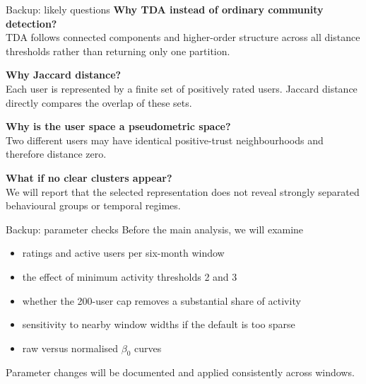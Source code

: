\documentclass[aspectratio=169,11pt]{beamer}
\newcommand{\term}[1]{\textcolor{Ocean}{\textbf{#1}}}
\begin{document}
\appendix

\begin{frame}[noframenumbering]{Backup: likely questions}
  \small
  \term{Why TDA instead of ordinary community detection?}\\
  TDA follows connected components and higher-order structure across all distance thresholds rather than returning only one partition.

  \vspace{0.35cm}
  \term{Why Jaccard distance?}\\
  Each user is represented by a finite set of positively rated users. Jaccard distance directly compares the overlap of these sets.

  \vspace{0.35cm}
  \term{Why is the user space a pseudometric space?}\\
  Two different users may have identical positive-trust neighbourhoods and therefore distance zero.

  \vspace{0.35cm}
  \term{What if no clear clusters appear?}\\
  We will report that the selected representation does not reveal strongly separated behavioural groups or temporal regimes.
\end{frame}

\begin{frame}[noframenumbering]{Backup: parameter checks}
  Before the main analysis, we will examine
  \begin{itemize}
    \item ratings and active users per six-month window
    \item the effect of minimum activity thresholds 2 and 3
    \item whether the 200-user cap removes a substantial share of activity
    \item sensitivity to nearby window widths if the default is too sparse
    \item raw versus normalised $\beta_0$ curves
  \end{itemize}

  \vspace{0.35cm}
  Parameter changes will be documented and applied consistently across windows.
\end{frame}
\end{document}
